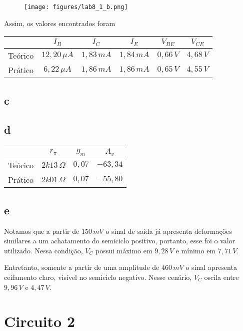 \documentclass[a4paper]{report}
\begin{document}
\begin{figure}[H]
    \centering
    \texttt{[image: figures/lab8\_1\_b.png]}
\end{figure}

Assim, os valores encontrados foram
\begin{table}[H]
    \centering
    \begin{tabular}{c | c | c | c | c | c}
	 & $I_B$ & $I_C$ & $I_E$ & $V_{BE}$ & $V_{CE}$ \\
	 \hline
	Teórico & $12,20\,\mu A$ & $1,83\,mA$ & $1,84\,mA$ & $0,66\,V$ & $4,68\,V$ \\
	Prático & $6,22\,\mu A$ & $1,86\,mA$ & $1,86\,mA$ & $0,65\,V$ & $4,55\,V$
    \end{tabular}
\end{table}

\subsection*{c}

\subsection*{d}

\begin{table}[H]
    \centering
    \begin{tabular}{c | c | c | c}
     & $r_\pi$ & $g_m$ & $A_v$ \\
     \hline
	Teórico & $2k13\,\Omega$ & $0,07$ & $-63,34$ \\
	Prático & $2k01\,\Omega$ & $0,07$ & $-55,80$
    \end{tabular}
\end{table}

\subsection*{e}

Notamos que a partir de $150\,mV$ o sinal de saída já apresenta deformações similares a um achatamento do semiciclo positivo, portanto, esse foi o valor utilizado. Nessa condição, $V_C$ possui máximo em $9,28\,V$ e mínimo em $7,71\,V$.

Entretanto, somente a partir de uma amplitude de $460\,mV$ o sinal apresenta ceifamento claro, visível no semiciclo negativo. Nesse cenário, $V_C$ oscila entre $9,96\,V$ e $4,47\,V$.

\section*{Circuito 2}
\end{document}
